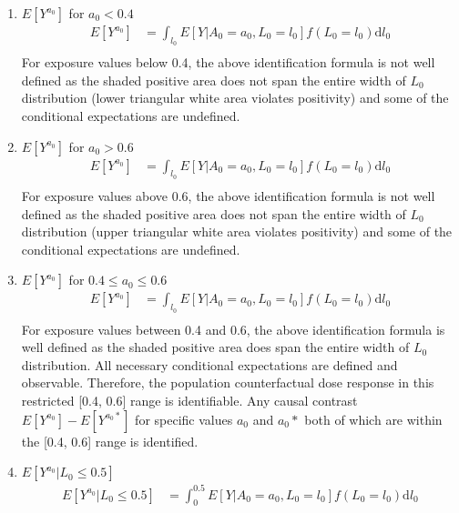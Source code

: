 \documentclass[dvipdfmx,10pt]{article}
\begin{document}
\begin{enumerate}
\item \(E[Y^{a_{0}}]\) for \(a_{0} < 0.4\)
\label{sec:org2cbb7ae}
\begin{align*}
  E[Y^{a_{0}}]
  &= \int_{l_{0}} E[Y | A_{0} = a_{0}, L_{0} = l_{0}] f(L_{0} = l_{0}) \text{d}l_{0}\\
\end{align*}
For exposure values below 0.4, the above identification formula is not well defined as the shaded positive area does not span the entire width of \(L_{0}\) distribution (lower triangular white area violates positivity) and some of the conditional expectations are undefined.

\item \(E[Y^{a_{0}}]\) for \(a_{0} > 0.6\)
\label{sec:org5ded2f8}
\begin{align*}
  E[Y^{a_{0}}]
  &= \int_{l_{0}} E[Y | A_{0} = a_{0}, L_{0} = l_{0}] f(L_{0} = l_{0}) \text{d}l_{0}\\
\end{align*}
For exposure values above 0.6, the above identification formula is not well defined as the shaded positive area does not span the entire width of \(L_{0}\) distribution (upper triangular white area violates positivity) and some of the conditional expectations are undefined.

\item \(E[Y^{a_{0}}]\) for \(0.4 \le a_{0} \le 0.6\)
\label{sec:org9326494}
\begin{align*}
  E[Y^{a_{0}}]
  &= \int_{l_{0}} E[Y | A_{0} = a_{0}, L_{0} = l_{0}] f(L_{0} = l_{0}) \text{d}l_{0}\\
\end{align*}
For exposure values between 0.4 and 0.6, the above identification formula is well defined as the shaded positive area does span the entire width of \(L_{0}\) distribution. All necessary conditional expectations are defined and observable. Therefore, the population counterfactual dose response in this restricted [0.4, 0.6] range is identifiable. Any causal contrast \(E[Y^{a_{0}}] - E[Y^{a_{0}*}]\) for specific values \(a_{0}\) and \(a_{0}*\) both of which are within the [0.4, 0.6] range is identified.

\item \(E[Y^{a_{0}} | L_{0} \le 0.5]\)
\label{sec:org0c596f7}
\begin{align*}
  E[Y^{a_{0}} | L_{0} \le 0.5]
  &= \int_{0}^{0.5} E[Y | A_{0} = a_{0}, L_{0} = l_{0}] f(L_{0} = l_{0}) \text{d}l_{0}\\
\end{align*}


\end{enumerate}
\end{document}
